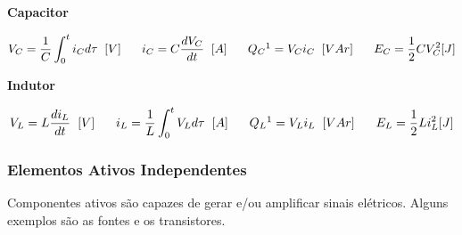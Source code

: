 \documentclass{article}
\numberwithin{equation}{section}
\begin{document}
\vspace{3mm}
\begin{center}{\textbf{Capacitor}}\end{center}
\begin{equation}
    V_{C} = \frac{1}{C}\int_{0}^{t}{i_{C}} d\tau \hspace{0.2cm}[V]
    \hspace{0.6cm}
    i_{C} = C \frac{dV_{C}}{dt} \hspace{0.2cm} [A]
    \hspace{0.6cm}
    Q_{C}\footnotemark[1] = V_{C}i_{C} \hspace{0.2cm} [VAr]
    \hspace{0.6cm}
    E_{C} = \frac{1}{2}CV_{C}^{2} [J]
    \end{equation}

\vspace{3mm}
\begin{center}{\textbf{Indutor}}\end{center}
\begin{equation}
    V_{L} = L \frac{di_{L}}{dt} \hspace{0.2cm}[V]
    \hspace{0.6cm}
    i_{L} = \frac{1}{L}\int_{0}^{t}{V_{L}} d\tau \hspace{0.2cm} [A]
    \hspace{0.6cm}
    Q_{L}\footnotemark[1] = V_{L}i_{L} \hspace{0.2cm} [VAr]
    \hspace{0.6cm}
    E_{L} = \frac{1}{2}Li_{L}^{2} [J]
\end{equation}

\vfill
\justifying
\subsubsection{Elementos Ativos Independentes}
\label{subsubsec:ativos}

Componentes ativos são capazes de gerar e/ou amplificar sinais elétricos. Alguns exemplos são as fontes e os transistores.

\vspace{3mm}
\end{document}
